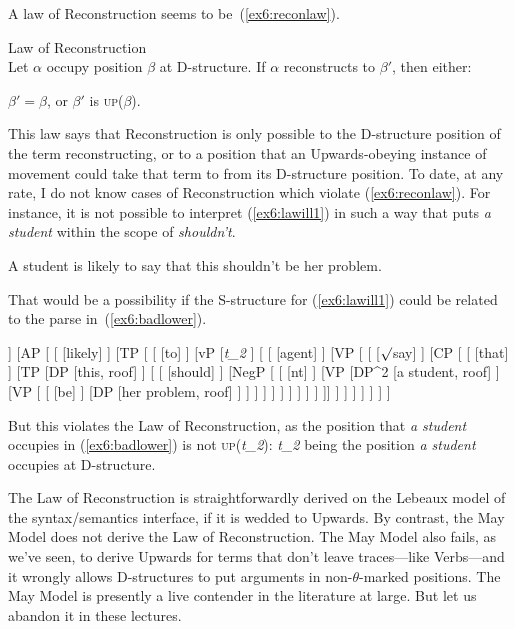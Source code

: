 A law of Reconstruction seems to be~(\ref{ex6:reconlaw}).
\begin{exe}
\raggedright
	\ex \label{ex6:reconlaw} Law of Reconstruction\\
	Let $\alpha$ occupy position $\beta$ at D-structure. If $\alpha$ reconstructs to $\beta '$, then either:
	\begin{xlist}
		\ex $\beta' = \beta$, or
		\ex $\beta '$ is \textsc{up}($\beta$).
	\end{xlist}
\end{exe}
This law says that Reconstruction is only possible to the D-structure position of the term reconstructing, or to a position that an Upwards-obeying instance of movement could take that term to from its D-structure position. To date, at any rate, I do not know cases of Reconstruction which violate (\ref{ex6:reconlaw}). For instance, it is not possible to interpret (\ref{ex6:lawill1}) in such a way that puts \emph{a student} within the scope of \emph{shouldn't}.
\begin{exe}
\raggedright
	\ex \label{ex6:lawill1} A student is likely to say that this shouldn't be her problem.
\end{exe}
That would be a possibility if the S-structure for (\ref{ex6:lawill1}) could be related to the parse in~(\ref{ex6:badlower}).
\begin{exe}
\raggedright
	\ex \label{ex6:badlower}
	\footnotesize
\begin{forest}
[TP
	[\obar{T} [pres] ]
	[AP [
		[ [likely] ]
		[TP [
			[ [to] ]
			[vP
				[\emph{t_2} ]
				[
					[ [agent] ]
					[VP [
						[ [$\surd$say] ]
						[CP [
							[ [that] ]
							[TP
								[DP [this, roof] ]
								[
									[ [should] ]
									[NegP [
										[ [nt] ]
										[VP
											[DP^2 [a student, roof] ]
											[VP [
												[ [be] ]
												[DP [her problem, roof] ]
											] ]
										 ]
									] ]
								 ]
							 ]
						] ]
					]]
				 ]
			 ]
		] ]
	] ]
]
\end{forest}
\end{exe}
But this violates the Law of Reconstruction, as the position that \emph{a student} occupies in (\ref{ex6:badlower}) is not \textsc{up}(\emph{t_2}): \emph{t_2} being the position \emph{a student} occupies at D-structure.

The Law of Reconstruction is straightforwardly derived on the Lebeaux model of the syntax/semantics interface, if it is wedded to Upwards. By contrast, the May Model does not derive the Law of Reconstruction. The May Model also fails, as we've seen, to derive Upwards for terms that don't leave traces---like Verbs---and it wrongly allows D-structures to put arguments in non-$\theta$-marked positions. The May Model is presently a live contender in the literature at large. But let us abandon it in these lectures. 

